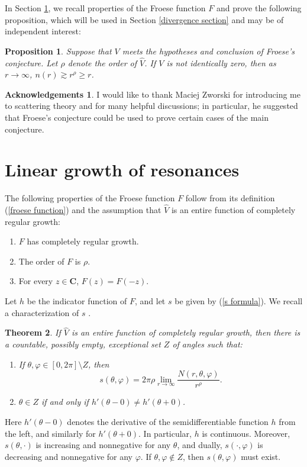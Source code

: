 \documentclass[reqno,12pt,letterpaper]{amsart}
\newcommand{\CC}{\mathbf{C}}
\newtheorem{theorem}{Theorem}[section]
\newtheorem{proposition}[theorem]{Proposition}
\theoremstyle{definition}
\newtheorem*{ack}{Acknowledgements}
\begin{document}
In Section \ref{linear growth}, we recall properties of the Froese function $F$ and prove the following proposition, which will be used in Section \ref{divergence section} and may be of independent interest:
\begin{proposition}
\label{linear lower bound}
Suppose that $V$ meets the hypotheses and conclusion of Froese's conjecture. Let $\rho$ denote the order of $\widehat V$. If $V$ is not identically zero, then as $r \to \infty$, $n(r) \gtrsim r^\rho \geq r$.
\end{proposition}

\begin{ack}
I would like to thank Maciej Zworski for introducing me to scattering theory and for many helpful discussions; in particular, he suggested that Froese's conjecture could be used to prove certain cases of the main conjecture.
\end{ack}

\section{Linear growth of resonances}
\label{linear growth}
The following properties of the Froese function $F$ follow from its definition (\ref{froese function}) and the assumption that $\widehat V$ is an entire function of completely regular growth:
\begin{enumerate}
\item $F$ has completely regular growth.
\item The order of $F$ is $\rho$.
\item For every $z \in \CC$, $F(z) = F(-z)$.
\end{enumerate}
Let $h$ be the indicator function of $F$, and let $s$ be given by (\ref{s formula}).
We recall a characterization of $s$ \cite[Theorem III.3]{levin1964distribution}.
\begin{theorem}
\label{zeroes of entire functions}
If $\widehat V$ is an entire function of completely regular growth, then there is a countable, possibly empty, exceptional set $Z$ of angles such that:
\begin{enumerate}
\item If $\theta, \varphi \in [0, 2\pi] \setminus Z$, then
$$s(\theta, \varphi) = 2\pi\rho \lim_{r\to\infty} \frac{N(r, \theta, \varphi)}{r^\rho}.$$
\item $\theta \in Z$ if and only if $h'(\theta - 0) \neq h'(\theta + 0)$.
\end{enumerate}
\end{theorem}
Here $h'(\theta - 0)$ denotes the derivative of the semidifferentiable function $h$ from the left, and similarly for $h'(\theta + 0)$.
In particular, $h$ is continuous.
Moreover, $s(\theta, \cdot)$ is increasing and nonnegative for any $\theta$, and dually, $s(\cdot, \varphi)$ is decreasing and nonnegative for any $\varphi$.
If $\theta, \varphi \notin Z$, then $s(\theta, \varphi)$ must exist.
\end{document}
